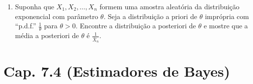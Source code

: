 \documentclass[leqno, 12pt]{article}
\theoremstyle{definition}
\newcommand{\rs}{X_1, X_2, \ldots, X_n} %
\begin{document}
\begin{enumerate}

\item \textbf{\parencite[ex. 21, pág. 407]{DeGroot:2014}} Suponha que \(\rs\) formem uma amostra aleatória da distribuição exponencial com parâmetro \(\theta\). Seja a distribuição a priori de \(\theta\) imprópria com ``p.d.f.'' \(\frac{1}{\theta}\) para \(\theta > 0\). Encontre a distribuição a posteriori de \(\theta\) e mostre que a média a posteriori de \(\theta\) é \(\frac{1}{\bar{X}_n}\).

\end{enumerate}

\section*{Cap. 7.4 (Estimadores de Bayes)}
\end{document}
